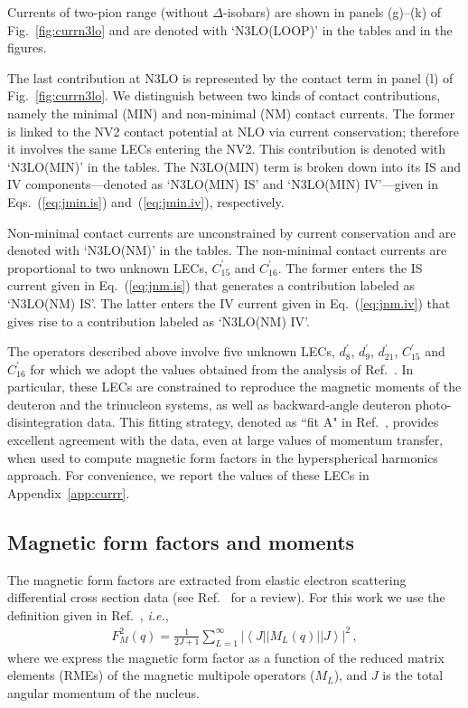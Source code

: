 \documentclass[aps,prc,floatfix,showpacs,twocolumn, preprintnumbers]{revtex4-2}
\begin{document}
Currents of two-pion range (without $\Delta$-isobars) are shown in panels (g)--(k) of Fig.~\ref{fig:currn3lo} and are denoted with `N3LO(LOOP)' in the tables and in the figures.

The last contribution at N3LO is represented by the contact term in panel (l) of Fig.~\ref{fig:currn3lo}. We distinguish between two kinds of contact contributions, namely the minimal (MIN) and non-minimal (NM) contact currents. The former is linked to the NV2 contact potential at NLO via current conservation; therefore it involves the same LECs entering the NV2. This contribution is denoted with `N3LO(MIN)' in the tables. The N3LO(MIN) term is broken down into its IS and IV components---denoted as `N3LO(MIN) IS' and `N3LO(MIN) IV'---given in Eqs.~(\ref{eq:jmin.is}) and~(\ref{eq:jmin.iv}), respectively. 

Non-minimal contact currents are unconstrained by current conservation and are denoted with `N3LO(NM)' in the tables. The non-minimal contact currents are proportional to two unknown LECs, $C_{15}^\prime$ and $C_{16}^\prime$. The former enters the IS current given in Eq.~(\ref{eq:jnm.is}) that generates a contribution labeled as `N3LO(NM) IS'. The latter enters the IV current given in Eq.~(\ref{eq:jnm.iv}) that gives rise to a contribution labeled as  `N3LO(NM) IV'.

The operators described above involve five unknown LECs, $d_8^\prime$, $d_9^\prime$, $d_{21}^\prime$, $C_{15}^\prime$ and $C_{16}^\prime$ for which we adopt the values obtained from the analysis of Ref.~\cite{Gnech:2022vwr}. In particular, these LECs are constrained to reproduce the magnetic moments of the deuteron and the trinucleon systems, as well as backward-angle deuteron photo-disintegration data. This fitting strategy, denoted as ``fit A" in Ref.~\cite{Gnech:2022vwr}, provides excellent agreement with the data, even at large values of momentum transfer, when used to compute magnetic form factors in the hyperspherical harmonics approach. For convenience, we report the values of these LECs in Appendix~\ref{app:currr}.

\subsection{Magnetic form factors and moments}
\label{sec:multipole}

The magnetic form factors are extracted from elastic electron scattering differential cross section data (see Ref.~\cite{Donnelly1984} for a review). For this work we use the definition given in Ref.~\cite{Donnelly1984}, {\it i.e.}, 
\begin{equation}
\begin{aligned}
F_M^2(q)= \frac{1}{2 J+1} \sum_{L=1}^{\infty}\left|\left\langle J ||M_L(q)|| J\right\rangle\right|^2\,,\label{eq:fm}
\end{aligned}
\end{equation}
where we express the magnetic form factor as a function of  the reduced matrix elements (RMEs) of the magnetic  multipole operators ($M_L$), and $J$ is the total angular momentum of the nucleus. 
\end{document}
